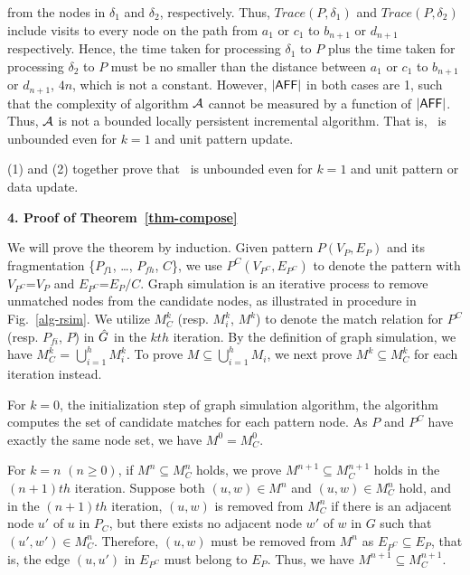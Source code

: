 from the nodes in $\delta_1$ and $\delta_2$, respectively.
Thus, $Trace(P, \delta_1)$ and $Trace(P, \delta_2)$ include visits to every node on the path from $a_1$ or $c_1$ to $b_{n+1}$ or $d_{n+1}$ respectively.
Hence, the time taken for processing $\delta_1$ to $P$ plus the time taken for processing $\delta_2$ to $P$ must be no smaller than the distance between $a_1$ or $c_1$ to $b_{n+1}$ or $d_{n+1}$, \ie $4n$, which is not a constant.
However, $|{\mathsf{AFF}}|$ in both cases are 1, such that the complexity of algorithm ${\cal A}$ cannot be measured by a function of $|{\mathsf{AFF}}|$.
Thus, ${\cal A}$ is not a bounded locally persistent incremental algorithm.
That is, \dynteamF\, is unbounded even for $k=1$ and unit pattern update.

\vspace{-1.0ex}
(1) and (2) together prove that \dynteamF\, is unbounded even for $k=1$ and unit pattern or data update.


\noindent
{\textbf{4. Proof of Theorem~\ref{thm-compose}}}

We will prove the theorem by induction.
Given pattern $P(V_P,E_P)$ and its fragmentation \{${P}_{f1}$, \ldots, ${P}_{fh}$, $C$\},
we use $P^{C}(V_{P^{C}},E_{P^{C}})$ to denote the pattern with $V_{P^{C}}$=$V_P$ and $E_{P^{C}}$=$E_P/C$.
Graph simulation is an iterative process to remove unmatched nodes from the candidate nodes,
as illustrated in procedure \rgraphsim in Fig.~\ref{alg-rsim}.
We utilize $M_{C}^{k}$ (resp. $M_{i}^{k}$, $M^{k}$) to denote the match relation for $P^{C}$ (resp. $P_{fi}$, $P$) in $\hat{G}{}$ in the $kth$ iteration.
By the definition of graph simulation, we have $M_{C}^{k}$ = $\bigcup_{i=1}^{h}M_{i}^{k}$.
To prove $M\subseteq\bigcup_{i=1}^{h}M_{i}$,
we next prove $M^{k}\subseteq M_{C}^{k}$ for each iteration instead.

\vspace{-1.8ex}
 For $k=0$, \ie the initialization step of graph simulation algorithm,
the algorithm computes the set of candidate matches for each pattern node.
As $P$ and $P^{C}$ have exactly the same node set, we have $M^{0}= M_{C}^{0}$.

\vspace{-1.8ex}
 For $k=n$ $(n\geq 0)$, if $M^{n}\subseteq M_{C}^{n}$ holds, we prove $M^{n+1}\subseteq M_{C}^{n+1}$ holds in the $(n+1)th$ iteration.
Suppose both $(u,w)\in M^{n}$ and $(u,w)\in M_{C}^{n}$ hold,
and in the $(n+1)th$ iteration, $(u,w)$ is removed from $M_{C}^{n}$ if there is an adjacent node $u'$ of $u$ in $P_{C}$,
but there exists no adjacent node $w'$ of $w$ in $G$ such that $(u',w')\in M_{C}^{n}$.
Therefore, $(u,w)$ must be removed from $M^{n}$ as $E_{P^{C}} \subseteq E_{P}$,
that is, the edge $(u,u')$ in $E_{P^{C}}$ must belong to $E_{P}$.
Thus, we have $M^{n+1}\subseteq M_{C}^{n+1}$.

